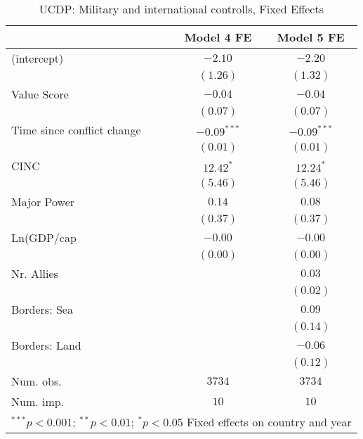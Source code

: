 
\begin{table}
\begin{center}
\begin{tabular}{l c c}
\toprule
 & Model 4 FE & Model 5 FE \\
\midrule
(intercept)                & $-2.10$       & $-2.20$       \\
                           & $(1.26)$      & $(1.32)$      \\
Value Score                & $-0.04$       & $-0.04$       \\
                           & $(0.07)$      & $(0.07)$      \\
Time since conflict change & $-0.09^{***}$ & $-0.09^{***}$ \\
                           & $(0.01)$      & $(0.01)$      \\
CINC                       & $12.42^{*}$   & $12.24^{*}$   \\
                           & $(5.46)$      & $(5.46)$      \\
Major Power                & $0.14$        & $0.08$        \\
                           & $(0.37)$      & $(0.37)$      \\
Ln(GDP/cap                 & $-0.00$       & $-0.00$       \\
                           & $(0.00)$      & $(0.00)$      \\
Nr. Allies                 &               & $0.03$        \\
                           &               & $(0.02)$      \\
Borders: Sea               &               & $0.09$        \\
                           &               & $(0.14)$      \\
Borders: Land              &               & $-0.06$       \\
                           &               & $(0.12)$      \\
\midrule
Num. obs.                  & $3734$        & $3734$        \\
Num. imp.                  & $10$          & $10$          \\
\bottomrule
\multicolumn{3}{l}{\scriptsize{$^{***}p<0.001$; $^{**}p<0.01$; $^{*}p<0.05$ 
                  Fixed effects on country and year}}
\end{tabular}
\caption{UCDP: Military and international controlls, Fixed Effects}
\label{UCDP_2_FE}
\end{center}
\end{table}
